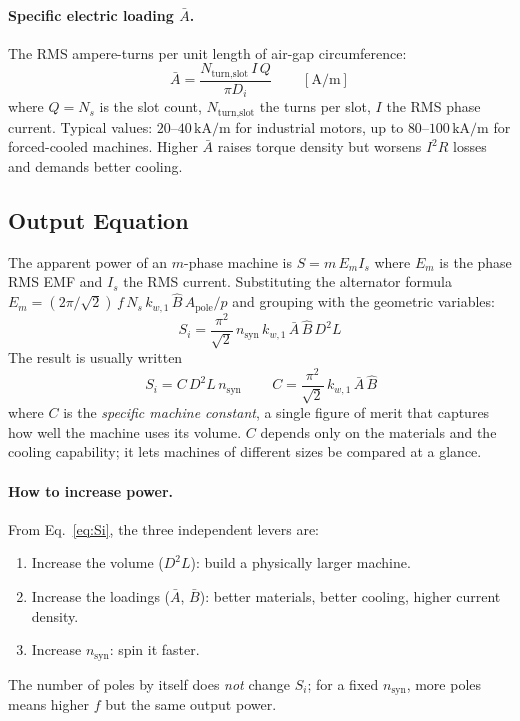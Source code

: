\documentclass[12pt,a4paper]{article}
\newcommand{\unit}[1]{\ensuremath{\,\mathrm{#1}}}
\begin{document}
\paragraph{Specific electric loading $\bar A$.}
The RMS ampere-turns per unit length of air-gap circumference:
\begin{equation}
  \bar A = \frac{N_\text{turn,slot}\,I\,Q}{\pi D_i}
  \qquad\unit{[A/m]}
\end{equation}
where $Q = N_s$ is the slot count, $N_\text{turn,slot}$ the turns per
slot, $I$ the RMS phase current. Typical values: $20$--$40\unit{kA/m}$
for industrial motors, up to $80$--$100\unit{kA/m}$ for forced-cooled
machines. Higher $\bar A$ raises torque density but worsens
$I^2R$ losses and demands better cooling.

\subsection{Output Equation}

The apparent power of an $m$-phase machine is
$S = m\,E_m I_s$ where $E_m$ is the phase RMS EMF and $I_s$ the RMS
current. Substituting the alternator formula
$E_m = (2\pi/\sqrt{2})\,f\,N_s\,k_{w,1}\,\hat{B}\,A_\text{pole}/p$
and grouping with the geometric variables:
\begin{equation}
  S_i
    = \frac{\pi^2}{\sqrt{2}}\,n_\text{syn}\,k_{w,1}\,\bar A\,\hat B\,D^2 L
  \label{eq:Si}
\end{equation}
The result is usually written
\begin{equation}
  \boxed{\,S_i = C\,D^2 L\,n_\text{syn}\,}
  \qquad
  C = \frac{\pi^2}{\sqrt{2}}\,k_{w,1}\,\bar A\,\hat B
  \label{eq:C}
\end{equation}
where $C$ is the \emph{specific machine constant}, a single figure of
merit that captures how well the machine uses its volume.
$C$ depends only on the materials and the cooling capability; it lets
machines of different sizes be compared at a glance.

\paragraph{How to increase power.}
From Eq.~\eqref{eq:Si}, the three independent levers are:
\begin{enumerate}[noitemsep]
  \item Increase the volume ($D^2 L$): build a physically larger machine.
  \item Increase the loadings ($\bar A$, $\bar B$): better materials,
        better cooling, higher current density.
  \item Increase $n_\text{syn}$: spin it faster.
\end{enumerate}
The number of poles by itself does \emph{not} change $S_i$; for a
fixed $n_\text{syn}$, more poles means higher $f$ but the same output
power.
\end{document}
